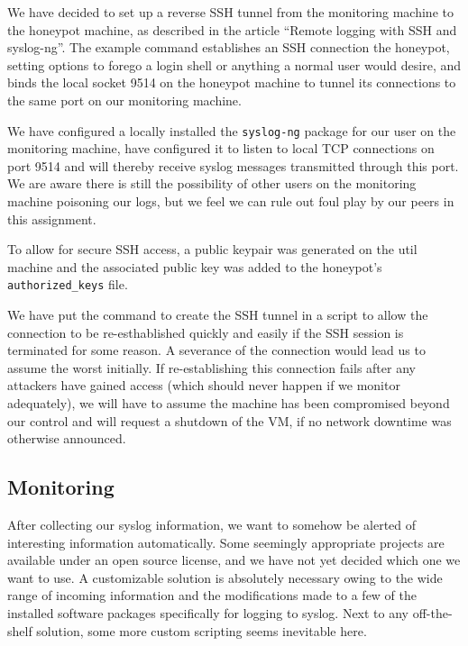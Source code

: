 \documentclass[11pt]{article} %
\begin{document}
We have decided to set up a reverse SSH tunnel from the monitoring machine to the honeypot machine, as described in the article ``Remote logging with SSH and syslog-ng''. \cite{remote_logging}
The example command establishes an SSH connection the honeypot, setting options to forego a login shell or anything a normal user would desire, and binds the local socket 9514 on the honeypot machine to tunnel its connections to the same port on our monitoring machine.

We have configured a locally installed the \verb|syslog-ng| package for our user on the monitoring machine, have configured it to listen to local TCP connections on port 9514 and will thereby receive syslog messages transmitted through this port.
We are aware there is still the possibility of other users on the monitoring machine poisoning our logs, but we feel we can rule out foul play by our peers in this assignment.

To allow for secure SSH access, a public keypair was generated on the util machine and the associated public key was added to the honeypot's \verb|authorized_keys| file.

We have put the command to create the SSH tunnel in a script to allow the connection to be re-esthablished quickly and easily if the SSH session is terminated for some reason. 
A severance of the connection would lead us to assume the worst initially.
If re-establishing this connection fails after any attackers have gained access (which should never happen if we monitor adequately), we will have to assume the machine has been compromised beyond our control and will request a shutdown of the VM, if no network downtime was otherwise announced.

\subsection{Monitoring}
After collecting our syslog information, we want to somehow be alerted of interesting information automatically.
Some seemingly appropriate projects are available under an open source license, and we have not yet decided which one we want to use.
A customizable solution is absolutely necessary owing to the wide range of incoming information and the modifications made to a few of the installed software packages specifically for logging to syslog.
Next to any off-the-shelf solution, some more custom scripting seems inevitable here.
\end{document}
